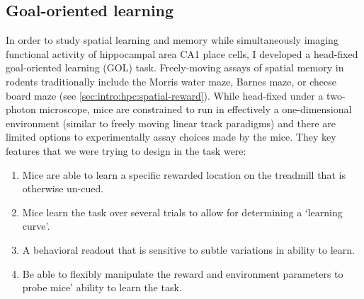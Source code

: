 \subsection{Goal-oriented learning}\label{sec:intro:techniques:GOL}
In order to study spatial learning and memory while simultaneously imaging functional activity of hippocampal area CA1 place cells, I developed a head-fixed goal-oriented learning (GOL) task.
Freely-moving assays of spatial memory in rodents traditionally include the Morris water maze, Barnes maze, or cheese board maze (see \autoref{sec:intro:hpc:spatial-reward}).
While head-fixed under a two-photon microscope, mice are constrained to run in effectively a one-dimensional environment (similar to freely moving linear track paradigms) and there are limited options to experimentally assay choices made by the mice.
They key features that we were trying to design in the task were:
\begin{enumerate}
	\item Mice are able to learn a specific rewarded location on the treadmill that is otherwise un-cued.\label{item:into:techniques:GOL:location}
	\item Mice learn the task over several trials to allow for determining a `learning curve'.\label{item:into:techniques:GOL:learning}
	\item A behavioral readout that is sensitive to subtle variations in ability to learn.\label{item:into:techniques:GOL:readout}
	\item Be able to flexibly manipulate the reward and environment parameters to probe mice' ability to learn the task.\label{item:into:techniques:GOL:manip}
\end{enumerate}

